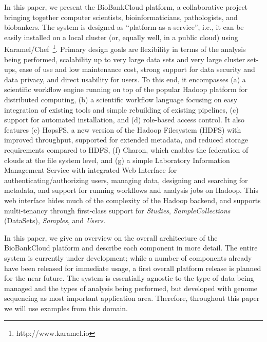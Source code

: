 In this paper, we present the BioBankCloud platform, a collaborative project bringing together computer scientists, bioinformaticians, pathologists, and biobankers. The system is designed as ``platform-as-a-service'', i.e., it can be easily installed on a local cluster (or, equally well, in a public cloud) using Karamel/Chef~\footnote{http://www.karamel.io}. Primary design goals are flexibility in terms of the analysis being performed, scalability up to very large data sets and very large cluster set-ups, ease of use and low maintenance cost, strong support for data security and data privacy, and direct usability for users. To this end, it encompasses (a) a scientific workflow engine running on top of the popular Hadoop platform for distributed computing, (b) a scientific workflow language focusing on easy integration of existing tools and simple rebuilding of existing pipelines, (c) support for automated installation, and (d) role-based access control. It also features (e) HopsFS, a new version of the Hadoop Filesystem (HDFS) with improved throughput, supported for extended metadata, and reduced storage requirements compared to HDFS, (f) Charon, which enables the federation of clouds at the file system level, and (g) a simple Laboratory Information Management Service with integrated Web Interface for authenticating/authorizing users, managing data, designing and searching for metadata, and support for running workflows and analysis jobs on Hadoop. This web interface hides much of the complexity of the Hadoop backend, and supports multi-tenancy through first-class support for \textit{Studies}, \textit{SampleCollections} (DataSets), \textit{Samples}, and \textit{Users}. 

In this paper, we give an overview on the overall architecture of the BioBankCloud platform and describe each component in more detail. The entire system is currently under development; while a number of components already have been released for immediate usage, a first overall platform release is planned for the near future. The system is essentially agnostic to the type of data being managed and the types of analysis being performed, but developed with genome sequencing as most important application area. Therefore, throughout this paper we will use examples from this domain. 